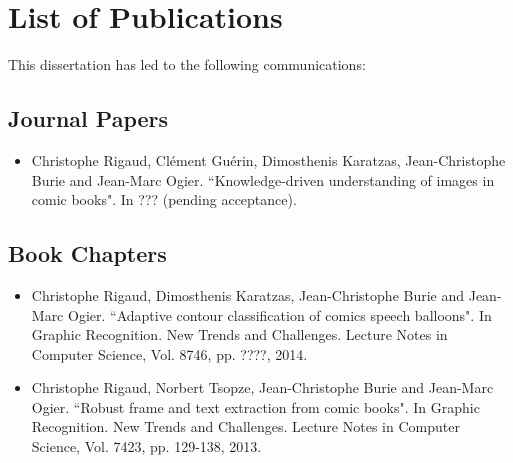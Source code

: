 \chapter{List of Publications}
\label{app:publications}


This dissertation has led to the following communications:

\section*{Journal Papers}

\begin{itemize}

\item Christophe Rigaud, Cl{\'e}ment Gu{\'e}rin, Dimosthenis Karatzas, Jean-Christophe Burie and Jean-Marc Ogier. ``Knowledge-driven understanding of images in comic books". In ??? (pending acceptance).
\vspace*{.3cm}

\vspace*{.3cm}

\end{itemize}

\section*{Book Chapters}

\begin{itemize}

\item Christophe Rigaud, Dimosthenis Karatzas, Jean-Christophe Burie and Jean-Marc Ogier. ``Adaptive contour classification of comics speech balloons". In Graphic Recognition. New Trends and Challenges. Lecture Notes in Computer Science, Vol. 8746, pp. ????, 2014.
\vspace*{.3cm}

\item Christophe Rigaud, Norbert Tsopze, Jean-Christophe Burie and Jean-Marc Ogier. ``Robust frame and text extraction from comic books". In Graphic Recognition. New Trends and Challenges. Lecture Notes in Computer Science, Vol. 7423, pp. 129-138, 2013.
\vspace*{.3cm}

\end{itemize}

